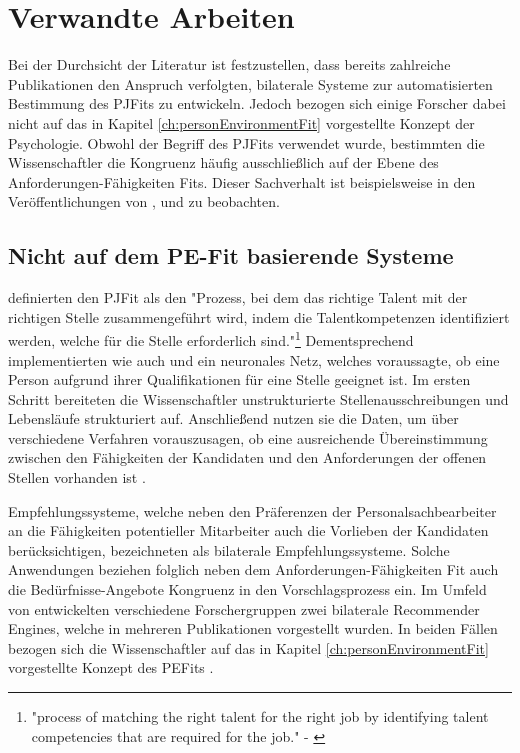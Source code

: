 \chapter{Verwandte Arbeiten}
\label{ch:verwandteArbeiten}
Bei der Durchsicht der Literatur ist festzustellen, dass bereits zahlreiche Publikationen den Anspruch verfolgten, bilaterale Systeme zur automatisierten Bestimmung des \acp{PJFit} zu entwickeln. Jedoch bezogen sich einige Forscher dabei nicht auf das in Kapitel \ref{ch:personEnvironmentFit} vorgestellte Konzept der Psychologie. Obwohl der Begriff des \acp{PJFit} verwendet wurde, bestimmten die Wissenschaftler die Kongruenz häufig ausschließlich auf der Ebene des Anforderungen-Fähigkeiten Fits. Dieser Sachverhalt ist beispielsweise in den Veröffentlichungen von \textcite[S. 1ff.]{luo:2019}, \textcite[S. 1ff.]{qin:2018} und \textcite[S. 1ff.]{personJobFit:2018} zu beobachten.

\section{Nicht auf dem PE-Fit basierende Systeme}
\label{ch:verwandteArbeiten:nichtAufDemPEFitBasierend}
\textcite[S. 1, Z. 1f.]{personJobFit:2018} definierten den \ac{PJFit} als den "Prozess, bei dem das richtige Talent mit der richtigen Stelle zusammengeführt wird, indem die Talentkompetenzen identifiziert werden, welche für die Stelle erforderlich sind."\footnote{"process of matching the right talent for the right job by identifying talent competencies that are required for the job." - \textcite[S. 1, Z. 1f.]{personJobFit:2018}} Dementsprechend implementierten \textcite[S. 1ff.]{personJobFit:2018} wie auch \textcite[S. 1ff.]{luo:2019} und \textcite[S. 1ff.]{qin:2018} ein neuronales Netz, welches voraussagte, ob eine Person aufgrund ihrer Qualifikationen für eine Stelle geeignet ist. Im ersten Schritt bereiteten die Wissenschaftler unstrukturierte Stellenausschreibungen und Lebensläufe strukturiert auf. Anschließend nutzen sie die Daten, um über verschiedene Verfahren vorauszusagen, ob eine ausreichende Übereinstimmung zwischen den Fähigkeiten der Kandidaten und den Anforderungen der offenen Stellen vorhanden ist \cite[S. 1ff.]{luo:2019}\cite[S. 1ff.]{qin:2018}\cite[S. 1ff.]{personJobFit:2018}.

Empfehlungssysteme, welche neben den Präferenzen der Personalsachbearbeiter an die Fähigkeiten potentieller Mitarbeiter auch die Vorlieben der Kandidaten berücksichtigen, bezeichneten \textcite[S. 4]{malinowski:2006} als bilaterale Empfehlungssysteme. Solche Anwendungen beziehen folglich neben dem Anforderungen-Fähigkeiten Fit auch die Bedürfnisse-Angebote Kongruenz in den Vorschlagsprozess ein. Im Umfeld von \textcite[S. 1ff.]{malinowski:2006} entwickelten verschiedene Forschergruppen zwei bilaterale Recommender Engines, welche in mehreren Publikationen vorgestellt wurden. In beiden Fällen bezogen sich die Wissenschaftler auf das in Kapitel \ref{ch:personEnvironmentFit} vorgestellte Konzept des \acp{PEFit} \cite[S. 4f.]{keim:2007}\cite[S. 3f.]{keim:2005}\cite[S. 3f.]{malinowski:2005}\cite[S. 3f.]{malinowski:2006}\cite[S. 3ff.]{malinowski:2008}.

